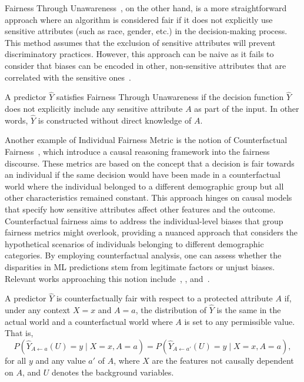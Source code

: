 Fairness Through Unawareness~\cite{Corbett-Davies2018}, on the other hand, is a more straightforward approach where an algorithm is considered fair if it does not explicitly use sensitive attributes (such as race, gender, etc.) in the decision-making process. This method assumes that the exclusion of sensitive attributes will prevent discriminatory practices. However, this approach can be naive as it fails to consider that biases can be encoded in other, non-sensitive attributes that are correlated with the sensitive ones~\cite{Mehrabi2019,caton2023,Hort2023}.

\begin{definition}\label{def:ftu}
A predictor $\hat{Y}$ satisfies Fairness Through Unawareness if the decision function $\hat{Y}$ does not explicitly include any sensitive attribute $A$ as part of the input. In other words, $\hat{Y}$ is constructed without direct knowledge of $A$.
\end{definition}

Another example of Individual Fairness Metric is the notion of Counterfactual Fairness~\citep{Kusner2018}, which introduce a causal reasoning framework into the fairness discourse. These metrics are based on the concept that a decision is fair towards an individual if the same decision would have been made in a counterfactual world where the individual belonged to a different demographic group but all other characteristics remained constant. This approach hinges on causal models that specify how sensitive attributes affect other features and the outcome. Counterfactual fairness aims to address the individual-level biases that group fairness metrics might overlook, providing a nuanced approach that considers the hypothetical scenarios of individuals belonging to different demographic categories. By employing counterfactual analysis, one can assess whether the disparities in ML predictions stem from legitimate factors or unjust biases. Relevant works approaching this notion include~\citet{Wu2022}, \citet{Yuchen2023}, and~\citet{GrariLD23}.

\begin{definition}\label{def:counterfactual_fairness}
A predictor $\hat{Y}$ is counterfactually fair with respect to a protected attribute $A$ if, under any context $X = x$ and $A = a$, the distribution of $\hat{Y}$ is the same in the actual world and a counterfactual world where $A$ is set to any permissible value. That is,
$$
P(\hat{Y}_{A \leftarrow a}(U) = y \mid X = x, A = a) = P(\hat{Y}_{A \leftarrow a'}(U) = y \mid X = x, A = a),
$$
for all $y$ and any value $a'$ of $A$, where $X$ are the features not causally dependent on $A$, and $U$ denotes the background variables.
\end{definition}

